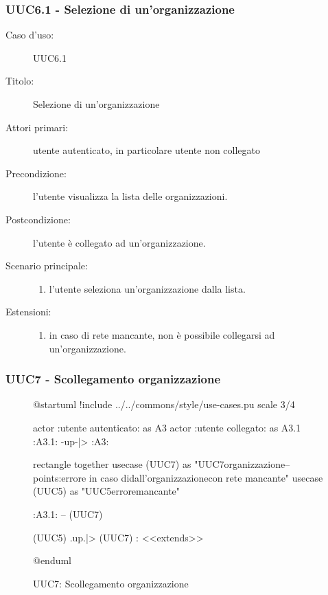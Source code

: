 \documentclass[casi-duso]{subfiles}
\begin{document}
\subsubsection{UUC6.1 - Selezione di un'organizzazione}%
\label{subsub:UUC6.1utente}
\begin{description}
  \item[Caso d’uso:] UUC6.1
  \item[Titolo:] Selezione di un'organizzazione
  \item[Attori primari:] utente autenticato, in particolare utente non collegato
  \item[Precondizione:] l'utente visualizza la lista delle organizzazioni.
  \item[Postcondizione:] l'utente è collegato ad un'organizzazione.
  \item[Scenario principale:]
        \begin{enumerate}
          \item l'utente seleziona un'organizzazione dalla lista.
        \end{enumerate}
  \item[Estensioni:]
        \begin{enumerate}
          \item in caso di rete mancante, non è possibile collegarsi ad un'organizzazione.
        \end{enumerate}
\end{description}

\subsubsection{UUC7 - Scollegamento organizzazione}%
\label{subsub:UUC7utente}

\begin{figure}[h!] 
  \centering 
  \begin{plantuml}
  @startuml
  !include ../../commons/style/use-cases.pu
  scale 3/4

  actor :utente autenticato: as A3
  actor :utente collegato: as A3.1
  :A3.1: -up-|> :A3:

  rectangle {
    together {
      usecase (UUC7) as "UUC7\nScollegamento organizzazione\n--\nExtension points:\nVisualizzazione errore in caso di\nscollegamento dall'organizzazione\n con rete mancante"
      usecase (UUC5) as "UUC5\nVisualizzazione errore\nrete mancante"
    }
  }

  :A3.1: -- (UUC7)

  (UUC5) .up.|> (UUC7) : <<extends>>

  @enduml  
    \end{plantuml} 
  \caption{UUC7: Scollegamento organizzazione} 
  \label{fig:uuc7} 
\end{figure}
\end{document}
